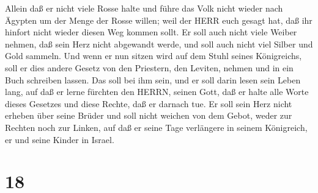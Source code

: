  Allein daß er nicht viele Rosse halte und führe das Volk
nicht wieder nach Ägypten um der Menge der Rosse willen; weil der HERR
euch gesagt hat, daß ihr hinfort nicht wieder diesen Weg kommen sollt.
 Er soll auch nicht viele Weiber nehmen, daß sein Herz
nicht abgewandt werde, und soll auch nicht viel Silber und Gold sammeln.
 Und wenn er nun sitzen wird auf dem Stuhl seines
Königreichs, soll er dies andere Gesetz von den Priestern, den Leviten,
nehmen und in ein Buch schreiben lassen.  Das soll bei ihm
sein, und er soll darin lesen sein Leben lang, auf daß er lerne fürchten
den HERRN, seinen Gott, daß er halte alle Worte dieses Gesetzes und
diese Rechte, daß er darnach tue.  Er soll sein Herz nicht
erheben über seine Brüder und soll nicht weichen von dem Gebot, weder
zur Rechten noch zur Linken, auf daß er seine Tage verlängere in seinem
Königreich, er und seine Kinder in Israel.

\hypertarget{section-17}{%
\section{18}\label{section-17}}

